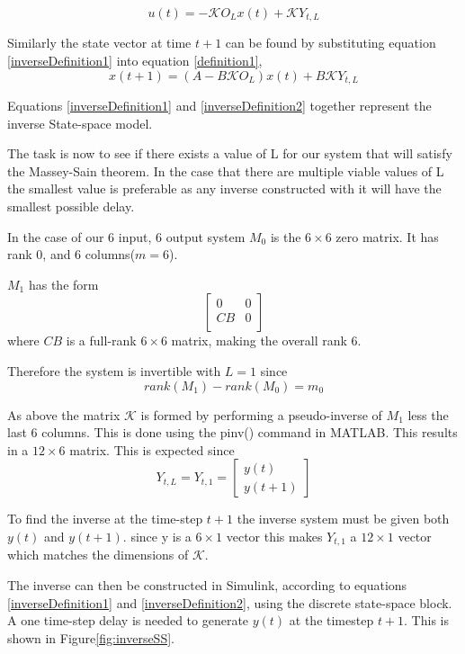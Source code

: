 \documentclass{report}
\begin{document}
\begin{equation}
\label{inverseDefinition1}
u(t) = -\mathcal{K}O_Lx(t) + \mathcal{K}Y_{t,L}
\end{equation}

Similarly the state vector at time $t+1$ can be found by substituting equation \ref{inverseDefinition1} into equation \ref{definition1},
\begin{equation}
\label{inverseDefinition2}
x(t+1) = (A-B\mathcal{K}O_L)x(t) + B\mathcal{K}Y_{t,L}
\end{equation}

Equations \ref{inverseDefinition1} and \ref{inverseDefinition2} together represent the inverse State-space model.

The task is now to see if there exists a value of L for our system that will satisfy the Massey-Sain theorem. In the case that there are multiple viable values of L the smallest value is preferable as any inverse constructed with it will have the smallest possible delay.

In the case of our 6 input, 6 output system $M_0$ is the $6\times6$ zero matrix. It has rank 0, and 6 columns($m=6$).

$M_1$ has the form
\[
\left[
\begin{array}{cc}
0	&	0	\\
CB	&	0	\\
\end{array}
\right]
\]
where $CB$ is a full-rank $6\times6$ matrix, making the overall rank 6.

Therefore the system is invertible with $L=1$ since
\[
rank(M_1) - rank(M_0) = m_0
\]

As above the matrix $\mathcal{K}$ is formed by performing a pseudo-inverse of $M_1$ less the last 6 columns. This is done using the pinv() command in MATLAB. This results in a $12\times6$ matrix. This is expected since
\[
Y_{t,L} = Y_{t,1} =
\begin{bmatrix}
y(t)	\\
y(t+1)
\end{bmatrix}
\]

To find the inverse at the time-step $t+1$ the inverse system must be given both $y(t)$ and $y(t+1)$. since y is a $6\times1$ vector this makes $Y_{t,1}$ a $12\times1$ vector which matches the dimensions of $\mathcal{K}$.

The inverse can then be constructed in Simulink, according to equations \ref{inverseDefinition1} and \ref{inverseDefinition2}, using the discrete state-space block. A one time-step delay is needed to generate $y(t)$ at the timestep $t+1$. This is shown in Figure\ref{fig:inverseSS}.
\end{document}

